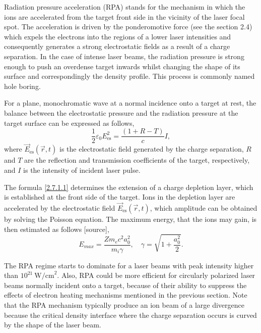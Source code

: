 Radiation pressure acceleration (RPA) stands for the mechanism in which the ions are accelerated from the target front side in the vicinity of the laser focal spot. The acceleration is driven by the ponderomotive force (see the section 2.4) which expels the electrons into the regions of a lower laser intensities and consequently generates a strong electrostatic fields as a result of a charge separation. In the case of intense laser beams, the radiation pressure is strong enough to push an overdense target inwards whilst changing the shape of its surface and correspondingly the density profile. This process is commonly named hole boring.

For a plane, monochromatic wave at a normal incidence onto a target at rest, the balance between the electrostatic pressure and the radiation pressure at the target surface can be expressed as follows,
\begin{equation}
\label{2.7.1.1}
\frac{1}{2} \varepsilon_0 E_{\mathrm{es}}^2 = \frac{\left( 1 + R - T \right)}{c} I,
\end{equation}
where $ \vec{E}_{\mathrm{es}} \left(\vec{r}, t \right) $ is the electrostatic field generated by the charge separation, $ R $ and $ T $ are the reflection and transmission coefficients of the target, respectively, and $ I $ is the intensity of incident laser pulse.

The formula \ref{2.7.1.1} determines the extension of a charge depletion layer, which is established at the front side of the target. Ions in the depletion layer are accelerated by the electrostatic field $ \vec{E}_{\mathrm{es}} \left(\vec{r}, t \right) $, which amplitude can be obtained by solving the Poisson equation. The maximum energy, that the ions may gain, is then estimated as follows [source],
\begin{equation}
E_{max} = \frac{Z m_e c^2 a_0^2}{m_i \gamma}, \quad \gamma = \sqrt{1 + \frac{a_0^2}{2}}.
\end{equation}
 
The RPA regime starts to dominate for a laser beams with peak intensity higher than $ 10^{21} \  \mathrm{W/cm}^2 $. Also, RPA could be more efficient for circularly polarized laser beams normally incident onto a target, because of their ability to suppress the effects of electron heating mechanisms mentioned in the previous section. Note that the RPA mechanism typically produce an ion beam of a large divergence because the critical density interface where the charge separation occurs is curved by the shape of the laser beam.

